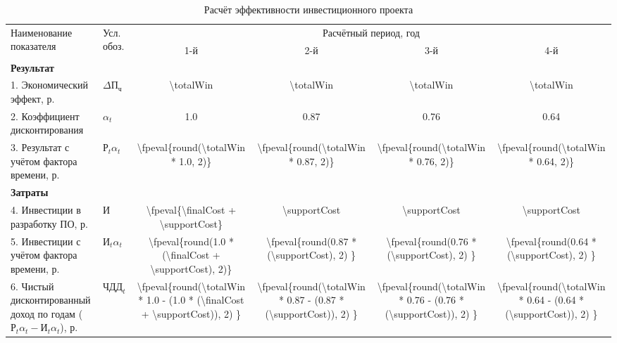 \bgroup
\def\arraystretch{1.2}
\begin{table}
	\caption{Расчёт эффективности инвестиционного проекта}
	\begin{tabular}{|p{3.1cm}|p{1.5cm}|c|c|c|c|}
		\hline
		\multirow{2}{*}{\parbox{3.8cm}{Наименование показателя}}
		& \multirow{2}{1.2cm}{Усл. обоз.}
		& \multicolumn{4}{c|}{Расчётный период, год}
		\\ \cline{3-6}
		& & 1-й & 2-й & 3-й & 4-й
		\\ \hline

		\textbf{Результат}
		& \multicolumn{5}{c|}{}
		\\ \hline

		1. Экономический эффект, р.
		& $\Delta\text{П}_\text{ч}$ %
		& \num{\totalWin}
		& \num{\totalWin}
		& \num{\totalWin}
		& \num{\totalWin}
		\\ \hline

		2. Коэффициент дисконтирования
		& $\alpha_t$
		& \num{1.0}
		& \num{0.87}
		& \num{0.76}
		& \num{0.64}
		\\ \hline

		3. Результат с учётом фактора времени, р.
		& $\text{Р}_t\alpha_t$
		& \num{\fpeval{round(\totalWin * 1.0, 2)}}
		& \num{\fpeval{round(\totalWin * 0.87, 2)}}
		& \num{\fpeval{round(\totalWin * 0.76, 2)}}
		& \num{\fpeval{round(\totalWin * 0.64, 2)}}
		\\ \hline

		\textbf{Затраты }
		& \multicolumn{5}{c|}{}
		\\ \hline

		4. Инвестиции в разработку ПО, р.
		& $\text{И}$
		& \num{\fpeval{\finalCost + \supportCost}}
		& \num{\supportCost}
		& \num{\supportCost}
		& \num{\supportCost}
		\\ \hline

		5. Инвестиции с учётом фактора времени, р.
		& $\text{И}_t\alpha_t$
		& \num{\fpeval{round(1.0 * (\finalCost + \supportCost), 2)}}
		& \num{\fpeval{round(0.87 * (\supportCost), 2)            }}
		& \num{\fpeval{round(0.76 * (\supportCost), 2)            }}
		& \num{\fpeval{round(0.64 * (\supportCost), 2)            }}
		\\ \hline

		6. Чистый дисконтированный доход по годам ($\text{Р}_t\alpha_t -
			\text{И}_t\alpha_t$), р.
		& $\text{ЧДД}_t$
		& \num{\fpeval{round(\totalWin * 1.0  -  (1.0 * (\finalCost +
		\supportCost)), 2)     }}
		& \num{\fpeval{round(\totalWin * 0.87 -  (0.87 * (\supportCost)), 2) }}
		& \num{\fpeval{round(\totalWin * 0.76 -  (0.76 * (\supportCost)), 2) }}
		& \num{\fpeval{round(\totalWin * 0.64 -  (0.64 * (\supportCost)), 2) }}
		\\ \hline
		

\end{tabular}
\end{table}
